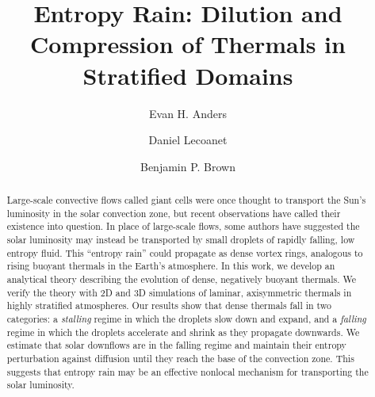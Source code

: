 \documentclass[twocolumn, amsmath, amsfonts, amssymb, trackchanges]{aastex62}
\begin{document}
\title{Entropy Rain: Dilution and Compression of Thermals in Stratified Domains}


\author[0000-0002-3433-4733]{Evan H. Anders}
\author[0000-0002-7635-9728]{Daniel Lecoanet}
\author[0000-0001-8935-219X]{Benjamin P. Brown}


\begin{abstract}
Large-scale convective flows called giant cells were once thought to transport the Sun's luminosity in the solar convection zone, but recent observations have called their existence into question.
In place of large-scale flows, some authors have suggested the solar luminosity may instead be transported by small droplets of rapidly falling, low entropy fluid.
This ``entropy rain'' could propagate as dense vortex rings, analogous to rising buoyant thermals in the Earth's atmosphere.
In this work, we develop an analytical theory describing the evolution of dense, negatively buoyant thermals.
We verify the theory with 2D and 3D simulations of laminar, axisymmetric thermals in highly stratified atmospheres.
Our results show that dense thermals fall in two categories: a \emph{stalling} regime in which the droplets slow down and expand, and a \emph{falling} regime in which the droplets accelerate and shrink as they propagate downwards.
We estimate that solar downflows are in the falling regime and maintain their entropy perturbation against diffusion until they reach the base of the convection zone.
This suggests that entropy rain may be an effective nonlocal mechanism for transporting the solar luminosity.
\end{abstract}


\end{document}
